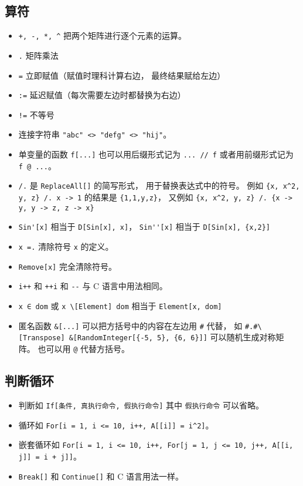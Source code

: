 \subsection{算符}
\begin{itemize}
\item \verb|+, -, *, ^| 把两个矩阵进行逐个元素的运算。
\item \verb|.| 矩阵乘法
\item \verb|=| 立即赋值（赋值时理科计算右边， 最终结果赋给左边）
\item \verb|:=| 延迟赋值（每次需要左边时都替换为右边）
\item \verb|!=| 不等号
\item 连接字符串 \verb|"abc" <> "defg" <> "hij"|。
\item 单变量的函数 \verb|f[...]| 也可以用后缀形式记为 \verb|... // f| 或者用前缀形式记为 \verb|f @ ...|。
\item \verb|/.| 是 \verb|ReplaceAll[]| 的简写形式， 用于替换表达式中的符号。 例如 \verb|{x, x^2, y, z} /. x -> 1| 的结果是 \verb|{1,1,y,z}|， 又例如 \verb|{x, x^2, y, z} /. {x -> y, y -> z, z -> x}|
\item \verb|Sin'[x]| 相当于 \verb|D[Sin[x], x]|， \verb|Sin''[x]| 相当于 \verb|D[Sin[x], {x,2}]|
\item \verb|x =.| 清除符号 \verb|x| 的定义。
\item \verb|Remove[x]| 完全清除符号。
\item \verb|i++| 和 \verb|++i| 和 \verb|--| 与 C 语言中用法相同。
\item \verb|x ∈ dom| 或 \verb|x \[Element] dom| 相当于 \verb|Element[x, dom]|
\item 匿名函数 \verb|&[...]| 可以把方括号中的内容在左边用 \verb|#| 代替， 如 \verb|#.#\[Transpose] &[RandomInteger[{-5, 5}, {6, 6}]]| 可以随机生成对称矩阵。 也可以用 \verb|@| 代替方括号。
\end{itemize}

\subsection{判断循环}
\begin{itemize}
\item 判断如 \verb|If[条件, 真执行命令, 假执行命令]| 其中 \verb|假执行命令| 可以省略。
\item 循环如 \verb|For[i = 1, i <= 10, i++, A[[i]] = i^2]|。
\item 嵌套循环如 \verb|For[i = 1, i <= 10, i++, For[j = 1, j <= 10, j++, A[[i, j]] = i + j]]|。
\item \verb|Break[]| 和 \verb|Continue[]| 和 C 语言用法一样。
\end{itemize}

